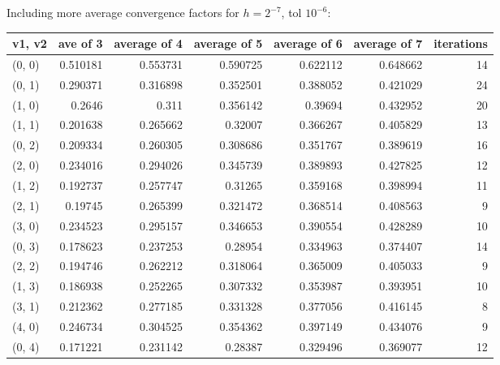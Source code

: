 \documentclass[12pt]{article}
\begin{document}
Including more average convergence factors for $h=2^{-7}$, tol $10^{-6}$: \\
\begin{table}
\centering
\begin{tabular}{lrrrrrr}
\hline
 v1, v2   &   ave of 3 &   average of 4 &   average of 5 &   average of 6 &   average of 7 &   iterations \\
\hline
 (0, 0)   &   0.510181 &       0.553731 &       0.590725 &       0.622112 &       0.648662 &           14 \\
 (0, 1)   &   0.290371 &       0.316898 &       0.352501 &       0.388052 &       0.421029 &           24 \\
 (1, 0)   &   0.2646   &       0.311    &       0.356142 &       0.39694  &       0.432952 &           20 \\
 (1, 1)   &   0.201638 &       0.265662 &       0.32007  &       0.366267 &       0.405829 &           13 \\
 (0, 2)   &   0.209334 &       0.260305 &       0.308686 &       0.351767 &       0.389619 &           16 \\
 (2, 0)   &   0.234016 &       0.294026 &       0.345739 &       0.389893 &       0.427825 &           12 \\
 (1, 2)   &   0.192737 &       0.257747 &       0.31265  &       0.359168 &       0.398994 &           11 \\
 (2, 1)   &   0.19745  &       0.265399 &       0.321472 &       0.368514 &       0.408563 &            9 \\
 (3, 0)   &   0.234523 &       0.295157 &       0.346653 &       0.390554 &       0.428289 &           10 \\
 (0, 3)   &   0.178623 &       0.237253 &       0.28954  &       0.334963 &       0.374407 &           14 \\
 (2, 2)   &   0.194746 &       0.262212 &       0.318064 &       0.365009 &       0.405033 &            9 \\
 (1, 3)   &   0.186938 &       0.252265 &       0.307332 &       0.353987 &       0.393951 &           10 \\
 (3, 1)   &   0.212362 &       0.277185 &       0.331328 &       0.377056 &       0.416145 &            8 \\
 (4, 0)   &   0.246734 &       0.304525 &       0.354362 &       0.397149 &       0.434076 &            9 \\
 (0, 4)   &   0.171221 &       0.231142 &       0.28387  &       0.329496 &       0.369077 &           12 \\
\hline
\end{tabular}
\end{table}
\end{document}
